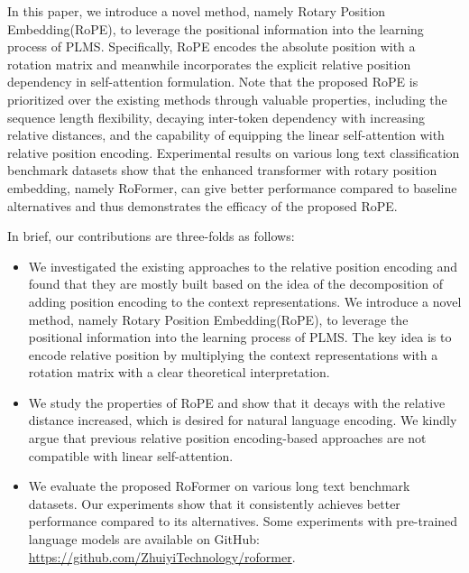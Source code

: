 \documentclass{article}
\begin{document}
In this paper, we introduce a novel method, namely Rotary Position Embedding(RoPE), to leverage the positional information into the learning process of PLMS. Specifically, RoPE encodes the absolute position with a rotation matrix and meanwhile incorporates the explicit relative position dependency in self-attention formulation. Note that the proposed RoPE is prioritized over the existing methods through valuable properties, including the sequence length flexibility, decaying inter-token dependency with increasing relative distances, and the capability of equipping the linear self-attention with relative position encoding.
Experimental results on various long text classification benchmark datasets show that the enhanced transformer with rotary position embedding, namely RoFormer, can give better performance compared to baseline alternatives and thus demonstrates the efficacy of the proposed RoPE.

In brief, our contributions are three-folds as follows:
\begin{itemize}
	\item We investigated the existing approaches to the relative position encoding and found that they are mostly built based on the idea of the decomposition of adding position encoding to the context representations. We introduce a novel method, namely Rotary Position Embedding(RoPE), to leverage the positional information into the learning process of PLMS. The key idea is  to encode relative position by multiplying the context representations with a rotation matrix with a clear theoretical interpretation.
	\item We study the properties of RoPE and show that it decays with the relative distance increased, which is desired for natural language encoding.  We kindly argue that previous relative position encoding-based approaches are not compatible with linear self-attention.
	
	\item We evaluate the proposed RoFormer on various long text benchmark datasets. Our experiments show that it consistently achieves better performance compared to its alternatives.  Some experiments with pre-trained language models are available on GitHub: \url{https://github.com/ZhuiyiTechnology/roformer}. 
\end{itemize}
\end{document}
